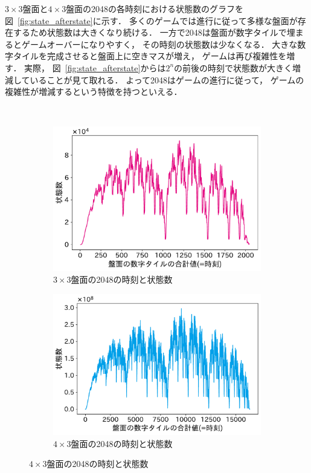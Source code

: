 $3\times3$盤面と$4\times3$盤面の2048の各時刻における状態数のグラフを図~\ref{fig:state_afterstate}に示す．
多くのゲームでは進行に従って多様な盤面が存在するため状態数は大きくなり続ける．
一方で2048は盤面が数字タイルで埋まるとゲームオーバーになりやすく， その時刻の状態数は少なくなる．
大きな数字タイルを完成させると盤面上に空きマスが増え， ゲームは再び複雑性を増す．
実際， 図~\ref{fig:state_afterstate}からは$2^n$の前後の時刻で状態数が大きく増減していることが見て取れる．
よって2048はゲームの進行に従って， ゲームの複雑性が増減するという特徴を持つといえる．
\begin{figure}　
\vspace{0.2cm}
\begin{subfigure}[T]{0.4\columnwidth}
    \centering
    \includegraphics[width=\columnwidth]{figures/graph_mini.pdf}
    \caption{$3\times3$盤面の2048の時刻と状態数}
    \label{fig:graph_mini}
\end{subfigure}
\hspace{1cm}
\begin{subfigure}[T]{0.4\columnwidth}
    \centering
    \includegraphics[width=\columnwidth]{figures/graph_mid.pdf}
    \caption{$4\times3$盤面の2048の時刻と状態数}
    \label{fig:graph_mid}
\end{subfigure}
\label{fig:time_state_num}
\end{figure}
